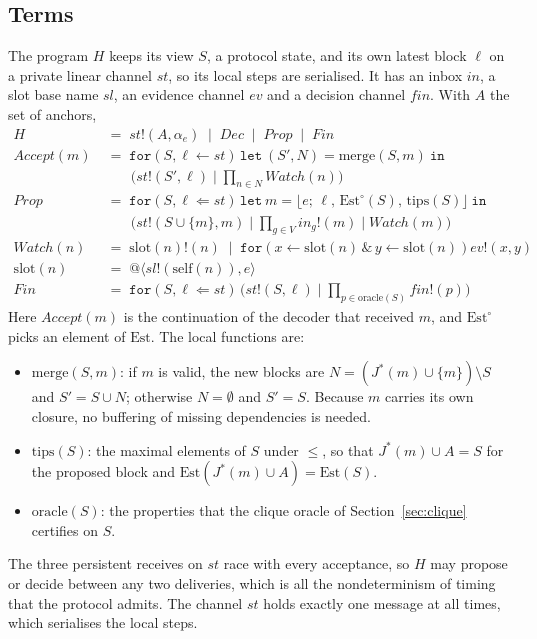\documentclass[11pt]{article}
\makeatletter
\theoremstyle{definition}
\theoremstyle{remark}
\newcommand{\prcv}[3]{\mathtt{for}(#1 \Leftarrow #2)#3}
\newcommand{\jrcv}[5]{\mathtt{for}(#1 \leftarrow #2 \,\&\, #3 \leftarrow #4)#5}
\newcommand{\snd}[2]{#1!(#2)}
\newcommand{\qn}[2]{@\langle #1, #2\rangle}
\newcommand{\blk}[4]{\lfloor #1;\, #2,\, #3,\, #4\rfloor}
\newcommand{\Jst}{J^{*}}
\newcommand{\slf}{\mathrm{self}}
\newcommand{\Est}{\mathrm{Est}}
\newcommand{\slot}{\mathrm{slot}}
\newcommand{\merge}{\mathrm{merge}}
\newcommand{\tips}{\mathrm{tips}}
\makeatother
\begin{document}
\subsection{Terms}

The program $H$ keeps its view $S$, a protocol state, and its own latest block
$\ell$ on a private linear channel $\mathit{st}$, so its local steps are
serialised. It has an inbox $\mathit{in}$, a slot base name $\mathit{sl}$, an
evidence channel $\mathit{ev}$ and a decision channel $\mathit{fin}$. With
$A$ the set of anchors,
\begin{align*}
H &\;=\; \snd{\mathit{st}}{A,\alpha_e}\;\mid\;\mathit{Dec}\;\mid\;\mathit{Prop}
  \;\mid\;\mathit{Fin}\\
\mathit{Accept}(m) &\;=\; \mathtt{for}(S,\ell \leftarrow \mathit{st})\,
  \mathtt{let}\ (S',N)=\merge(S,m)\ \mathtt{in}\\
  &\qquad\bigl(\snd{\mathit{st}}{S',\ell}\mid\textstyle\prod_{n\in N}\mathit{Watch}(n)\bigr)\\
\mathit{Prop} &\;=\; \mathtt{for}(S,\ell \Leftarrow \mathit{st})\,
  \mathtt{let}\ m=\blk{e}{\ell}{\Est^{\circ}(S)}{\tips(S)}\ \mathtt{in}\\
  &\qquad\bigl(\snd{\mathit{st}}{S\cup\{m\},m}\mid\textstyle\prod_{g\in V}
  \snd{\mathit{in}_g}{m}\mid\mathit{Watch}(m)\bigr)\\
\mathit{Watch}(n) &\;=\; \snd{\slot(n)}{n}\;\mid\;
  \jrcv{x}{\slot(n)}{y}{\slot(n)}{\snd{\mathit{ev}}{x,y}}\\
\slot(n) &\;=\; \qn{\snd{\mathit{sl}}{\slf(n)}}{e}\\
\mathit{Fin} &\;=\; \prcv{S,\ell}{\mathit{st}}{\,\bigl(\snd{\mathit{st}}{S,\ell}
  \mid\textstyle\prod_{p\in\mathrm{oracle}(S)}\snd{\mathit{fin}}{p}\bigr)}
\end{align*}
Here $\mathit{Accept}(m)$ is the continuation of the decoder that received
$m$, and $\Est^{\circ}$ picks an element of $\Est$. The local functions are:
\begin{itemize}[leftmargin=1.5em]
\item $\merge(S,m)$: if $m$ is valid, the new blocks are
  $N=(\Jst(m)\cup\{m\})\setminus S$ and $S'=S\cup N$; otherwise $N=\emptyset$
  and $S'=S$. Because $m$ carries its own closure, no buffering of missing
  dependencies is needed.
\item $\tips(S)$: the maximal elements of $S$ under $\le$, so that
  $\Jst(m)\cup A = S$ for the proposed block and $\Est(\Jst(m)\cup A)=\Est(S)$.
\item $\mathrm{oracle}(S)$: the properties that the clique oracle of
  Section~\ref{sec:clique} certifies on $S$.
\end{itemize}
The three persistent receives on $\mathit{st}$ race with every acceptance, so
$H$ may propose or decide between any two deliveries, which is all the
nondeterminism of timing that the protocol admits. The channel $\mathit{st}$
holds exactly one message at all times, which serialises the local steps.
\end{document}
